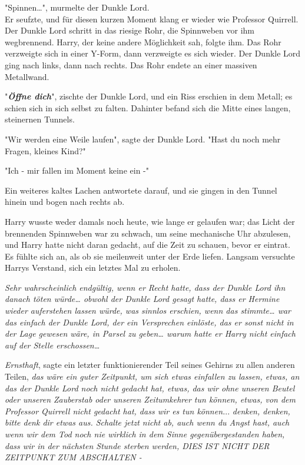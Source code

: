 {"Spinnen…", murmelte der Dunkle Lord.\\ Er seufzte, und für diesen kurzen Moment klang er wieder wie Professor Quirrell. Der Dunkle Lord schritt in das riesige Rohr, die Spinnweben vor ihm wegbrennend. Harry, der keine andere Möglichkeit sah, folgte ihm. Das Rohr verzweigte sich in einer Y-Form, dann verzweigte es sich wieder. Der Dunkle Lord ging nach links, dann nach rechts. Das Rohr endete an einer massiven Metallwand.

"\textbf{\emph{Öffne dich}}", zischte der Dunkle Lord, und ein Riss erschien in dem Metall; es schien sich in sich selbst zu falten. Dahinter befand sich die Mitte eines langen, steinernen Tunnels.

"Wir werden eine Weile laufen", sagte der Dunkle Lord. "Hast du noch mehr Fragen, kleines Kind?"

"Ich - mir fallen im Moment keine ein -"

Ein weiteres kaltes Lachen antwortete darauf, und sie gingen in den Tunnel hinein und bogen nach rechts ab.

Harry wusste weder damals noch heute, wie lange er gelaufen war; das Licht der brennenden Spinnweben war zu schwach, um seine mechanische Uhr abzulesen, und Harry hatte nicht daran gedacht, auf die Zeit zu schauen, bevor er eintrat. Es fühlte sich an, als ob sie meilenweit unter der Erde liefen. Langsam versuchte Harrys Verstand, sich ein letztes Mal zu erholen.

\emph{Sehr wahrscheinlich endgültig, wenn er Recht hatte, dass der Dunkle Lord ihn danach töten würde… obwohl der Dunkle Lord gesagt hatte, dass er Hermine wieder auferstehen lassen würde, was sinnlos erschien, wenn das stimmte… war das einfach der Dunkle Lord, der ein Versprechen einlöste, das er sonst nicht in der Lage gewesen wäre, in Parsel zu geben… warum hatte er Harry nicht einfach auf der Stelle erschossen…}

\emph{Ernsthaft}, sagte ein letzter funktionierender Teil seines Gehirns zu allen anderen Teilen, \emph{das wäre ein guter Zeitpunkt, um sich etwas einfallen zu lassen, etwas, an das der Dunkle Lord noch nicht gedacht hat, etwas, das wir ohne unseren Beutel oder unseren Zauberstab oder unseren Zeitumkehrer tun können, etwas, von dem Professor Quirrell nicht gedacht hat, dass wir es tun können.}.. \emph{denken, denken, bitte denk dir etwas aus. Schalte jetzt nicht ab, auch wenn du Angst hast, auch wenn wir dem Tod noch nie wirklich in dem Sinne gegenübergestanden haben, dass wir in der nächsten Stunde sterben werden, DIES IST NICHT DER ZEITPUNKT ZUM ABSCHALTEN -}

}
